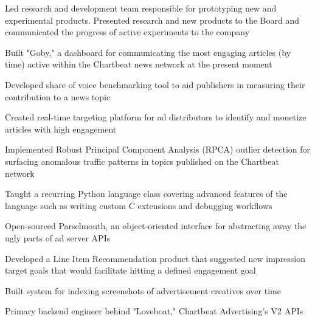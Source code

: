 \documentclass[]{deedy-resume-openfont}
\begin{document}
    \begin{tightemize}
        \item
            Led research and development team responsible for prototyping new
            and experimental products. Presented research and new products to
            the Board and communicated the progress of active experiments to
            the company
        \item
            Built "Goby," a dashboard for communicating the most engaging
            articles (by time) active within the Chartbeat news network at the
            present moment
        \item
            Developed share of voice benchmarking tool to aid publishers in
            measuring their contribution to a news topic
        \item
            Created real-time targeting platform for ad distributors to
            identify and monetize articles with high engagement
        \item
            Implemented Robust Principal Component Analysis (RPCA) outlier
            detection for surfacing anomalous traffic patterns in topics
            published on the Chartbeat network
        \item
            Taught a recurring Python language class covering advanced features
            of the language such as writing custom C extensions and debugging
            workflows
    \end{tightemize}
    \vspace{5pt}

    \begin{tightemize}
        \item
            Open-sourced Parselmouth, an object-oriented interface for
            abstracting away the ugly parts of ad server APIs
        \item
            Developed a Line Item Recommendation product that suggested new
            impression target goals that would facilitate hitting a defined
            engagement goal
        \item
            Built system for indexing screenshots of advertisement creatives
            over time
        \item
            Primary backend engineer behind "Loveboat," Chartbeat Advertising's
            V2 APIs
    \end{tightemize}
\end{document}
